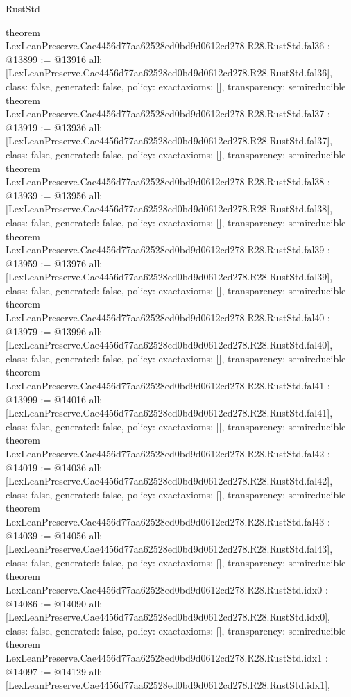 \begin{lexlean}{RustStd}
\begin{coremodule}
{}
theorem LexLeanPreserve.Cae4456d77aa62528ed0bd9d0612cd278.R28.RustStd.fal36 : @13899 := @13916 {
  all: [LexLeanPreserve.Cae4456d77aa62528ed0bd9d0612cd278.R28.RustStd.fal36],
  class: false,
  generated: false,
  policy: exact{axioms: []},
  transparency: semireducible
}
theorem LexLeanPreserve.Cae4456d77aa62528ed0bd9d0612cd278.R28.RustStd.fal37 : @13919 := @13936 {
  all: [LexLeanPreserve.Cae4456d77aa62528ed0bd9d0612cd278.R28.RustStd.fal37],
  class: false,
  generated: false,
  policy: exact{axioms: []},
  transparency: semireducible
}
theorem LexLeanPreserve.Cae4456d77aa62528ed0bd9d0612cd278.R28.RustStd.fal38 : @13939 := @13956 {
  all: [LexLeanPreserve.Cae4456d77aa62528ed0bd9d0612cd278.R28.RustStd.fal38],
  class: false,
  generated: false,
  policy: exact{axioms: []},
  transparency: semireducible
}
theorem LexLeanPreserve.Cae4456d77aa62528ed0bd9d0612cd278.R28.RustStd.fal39 : @13959 := @13976 {
  all: [LexLeanPreserve.Cae4456d77aa62528ed0bd9d0612cd278.R28.RustStd.fal39],
  class: false,
  generated: false,
  policy: exact{axioms: []},
  transparency: semireducible
}
theorem LexLeanPreserve.Cae4456d77aa62528ed0bd9d0612cd278.R28.RustStd.fal40 : @13979 := @13996 {
  all: [LexLeanPreserve.Cae4456d77aa62528ed0bd9d0612cd278.R28.RustStd.fal40],
  class: false,
  generated: false,
  policy: exact{axioms: []},
  transparency: semireducible
}
theorem LexLeanPreserve.Cae4456d77aa62528ed0bd9d0612cd278.R28.RustStd.fal41 : @13999 := @14016 {
  all: [LexLeanPreserve.Cae4456d77aa62528ed0bd9d0612cd278.R28.RustStd.fal41],
  class: false,
  generated: false,
  policy: exact{axioms: []},
  transparency: semireducible
}
theorem LexLeanPreserve.Cae4456d77aa62528ed0bd9d0612cd278.R28.RustStd.fal42 : @14019 := @14036 {
  all: [LexLeanPreserve.Cae4456d77aa62528ed0bd9d0612cd278.R28.RustStd.fal42],
  class: false,
  generated: false,
  policy: exact{axioms: []},
  transparency: semireducible
}
theorem LexLeanPreserve.Cae4456d77aa62528ed0bd9d0612cd278.R28.RustStd.fal43 : @14039 := @14056 {
  all: [LexLeanPreserve.Cae4456d77aa62528ed0bd9d0612cd278.R28.RustStd.fal43],
  class: false,
  generated: false,
  policy: exact{axioms: []},
  transparency: semireducible
}
theorem LexLeanPreserve.Cae4456d77aa62528ed0bd9d0612cd278.R28.RustStd.idx0 : @14086 := @14090 {
  all: [LexLeanPreserve.Cae4456d77aa62528ed0bd9d0612cd278.R28.RustStd.idx0],
  class: false,
  generated: false,
  policy: exact{axioms: []},
  transparency: semireducible
}
theorem LexLeanPreserve.Cae4456d77aa62528ed0bd9d0612cd278.R28.RustStd.idx1 : @14097 := @14129 {
  all: [LexLeanPreserve.Cae4456d77aa62528ed0bd9d0612cd278.R28.RustStd.idx1],
}
\end{coremodule}
\end{lexlean}
